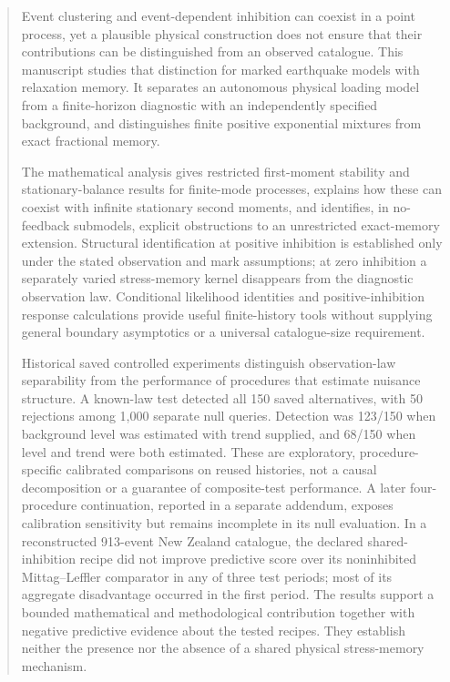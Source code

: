 \begin{abstract}
Event clustering and event-dependent inhibition can coexist in a point process, yet a plausible physical construction does not ensure that their contributions can be distinguished from an observed catalogue. This manuscript studies that distinction for marked earthquake models with relaxation memory. It separates an autonomous physical loading model from a finite-horizon diagnostic with an independently specified background, and distinguishes finite positive exponential mixtures from exact fractional memory.

The mathematical analysis gives restricted first-moment stability and stationary-balance results for finite-mode processes, explains how these can coexist with infinite stationary second moments, and identifies, in no-feedback submodels, explicit obstructions to an unrestricted exact-memory extension. Structural identification at positive inhibition is established only under the stated observation and mark assumptions; at zero inhibition a separately varied stress-memory kernel disappears from the diagnostic observation law. Conditional likelihood identities and positive-inhibition response calculations provide useful finite-history tools without supplying general boundary asymptotics or a universal catalogue-size requirement.

Historical saved controlled experiments distinguish observation-law separability from the performance of procedures that estimate nuisance structure. A known-law test detected all 150 saved alternatives, with 50 rejections among 1,000 separate null queries. Detection was 123/150 when background level was estimated with trend supplied, and 68/150 when level and trend were both estimated. These are exploratory, procedure-specific calibrated comparisons on reused histories, not a causal decomposition or a guarantee of composite-test performance. A later four-procedure continuation, reported in a separate addendum, exposes calibration sensitivity but remains incomplete in its null evaluation. In a reconstructed 913-event New Zealand catalogue, the declared shared-inhibition recipe did not improve predictive score over its noninhibited Mittag--Leffler comparator in any of three test periods; most of its aggregate disadvantage occurred in the first period. The results support a bounded mathematical and methodological contribution together with negative predictive evidence about the tested recipes. They establish neither the presence nor the absence of a shared physical stress-memory mechanism.
\end{abstract}
